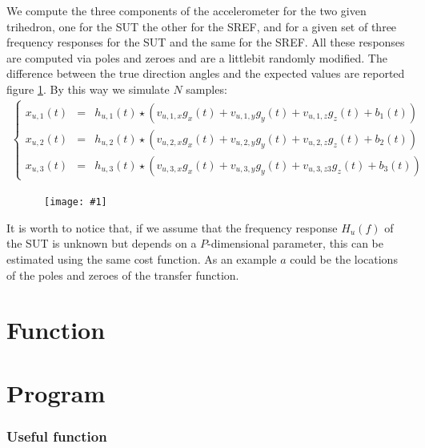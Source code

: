\documentclass[a4paper, 12pt]{report}
\newcommand{\figscale}[4]{
\begin{figure}[hbtp]
\centerline{
    \hbox{ \texttt{[image: \#1]} }
}
\begin{center}
\parbox{14 cm}
{
    \caption{\protect\small\it  {#2}}
    \label {#3}
}
\end{center}

\end{figure}}
\begin{document}
We compute the three components of the accelerometer for the two given trihedron, one for the SUT  the other for the SREF, and for a given set of three frequency responses for the SUT and the same for the SREF. All these responses are computed via poles and zeroes and are a littlebit randomly modified. The difference between the true direction angles and the expected values are reported figure \ref{fig:boxplotoaande}. By this way we simulate $N$ samples:
\begin{eqnarray*}
\label{eq:signalsT}
\left\{
\begin{array}{rcl}
x_{u,1}(t)&=&h_{u,1}(t)\star (v_{u,1,x}g_{x}(t)+v_{u,1,y}g_{y}(t)+v_{u,1,z}g_{z}(t)+b_{1}(t))
\\
x_{u,2}(t)&=&h_{u,2}(t)\star (v_{u,2,x}g_{x}(t)+v_{u,2,y}g_{y}(t)+v_{u,2,z}g_{z}(t)+b_{2}(t))
\\
x_{u,3}(t)&=&h_{u,3}(t)\star (v_{u,3,x}g_{x}(t)+v_{u,3,y}g_{y}(t)+v_{u,3,z3}g_{z}(t)+b_{3}(t))
\end{array}
\right.
\end{eqnarray*}

\figscale{boxplotoaande.pdf}{}{fig:boxplotoaande}{1}

It is worth to notice that, if we assume that the frequency response $H_{u}(f)$ of the SUT is unknown but depends on a $P$-dimensional parameter, this can be estimated using the same cost function. As an example $a$ could be the locations of the poles and zeroes of the transfer function.
%
%

\appendix
\section{Function}

{\tiny }


\section{Program}

{\tiny }


\subsubsection{Useful function}

{\tiny }
\end{document}
